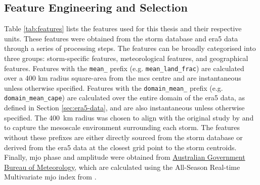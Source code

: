 \subsection{Feature Engineering and Selection}

Table \ref{tab:features} lists the features used for this thesis and their respective units. These features were obtained from the \cite{Hill2023} storm database and \acrshort{era5} data through a series of processing steps. The features can be broadly categorised into three groups: storm-specific features, meteorological features, and geographical features. Features with the \texttt{mean\_} prefix (e.g. \texttt{mean\_land\_frac}) are calculated over a 400 km radius square-area from the \acrshort{mcs} centre and are instantaneous unless otherwise specified. Features with the \texttt{domain\_mean\_} prefix (e.g. \texttt{domain\_mean\_cape}) are calculated over the entire domain of the \acrshort{era5} data, as defined in Section \ref{sec:era5-data}, and are also instantaneous unless otherwise specified. The \SI{400}{\km} radius was chosen to align with the original study by \cite{Hunt2024} and to capture the mesoscale environment surrounding each storm. The features without these prefixes are either directly sourced from the storm database or derived from the \acrshort{era5} data at the closest grid point to the storm centroids. Finally, \acrshort{mjo} phase and amplitude were obtained from \href{https://www.bom.gov.au/climate/mjo/}{Australian Government Bureau of Meteorology}, which are calculated using the All-Season Real-time Multivariate \acrshort{mjo} index from \cite{Wheeler2004}.

